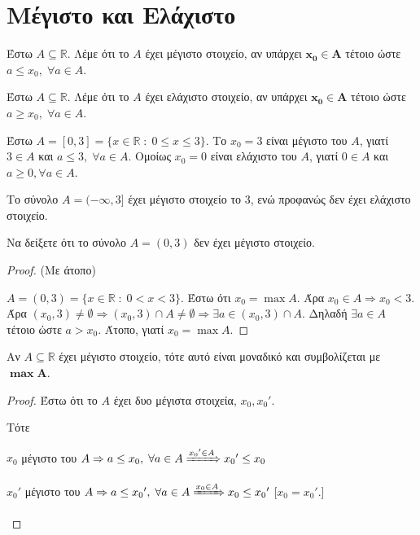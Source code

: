 \documentclass[main.tex]{subfiles}
\begin{document}
\section{Μέγιστο και Ελάχιστο}

\begin{mydfnbox}
  Έστω $ A \subseteq \mathbb{R} $. Λέμε ότι το $A$ έχει μέγιστο στοιχείο, 
  αν υπάρχει $ \bm{x_{0} \in A} $ τέτοιο ώστε $ a \leq x_{0}, \; \forall a \in A $.
\end{mydfnbox}

\begin{mydfnbox}
  Έστω $ A \subseteq \mathbb{R} $. Λέμε ότι το $A$ έχει ελάχιστο στοιχείο, 
  αν υπάρχει $ \bm{x_{0} \in A} $ τέτοιο ώστε $ a \geq x_{0}, \; \forall a \in A$.
\end{mydfnbox}

\begin{example}
  Έστω $ A = [0,3] = \{ x \in \mathbb{R} \; : \; 0 \leq x \leq 3 \} $. 
  Το $ x_{0}= 3 $ είναι μέγιστο του $A$, γιατί $ 3 \in A $ και 
  $ a \leq 3, \; \forall a \in A $. Ομοίως $ x_{0}= 0 $ είναι ελάχιστο 
  του $A$, γιατί $ 0 \in A $ και $ a \geq 0, \forall a \in A $.
\end{example}

\begin{example}
  Το σύνολο $ A=(- \infty, 3] $ έχει μέγιστο στοιχείο το 3, ενώ προφανώς δεν έχει 
  ελάχιστο στοιχείο.
\end{example}

\begin{example}
  Να δείξετε ότι το σύνολο $ A = (0,3) $ δεν έχει μέγιστο στοιχείο.
\end{example}
\begin{proof}(Με άτοπο)
\item {}
  $ A = (0,3) = \{ x \in \mathbb{R} \; : \; 0 < x < 3 \} $. 
  Έστω ότι $ x_{0} = \max A $. Άρα $ x_{0} \in A \Rightarrow  x_{0} 
  < 3$. Άρα  $ (x_{0}, 3) \neq \emptyset \Rightarrow (x_{0},3) \cap A \neq 
  \emptyset \Rightarrow \exists a \in (x_{0},3) \cap A $. Δηλαδή $ 
  \exists a \in A$ τέτοιο ώστε $ a > x_{0} $. Άτοπο, γιατί $ x_{0}= \max A $.
\end{proof}

\begin{mypropbox}
  Αν $ A \subseteq \mathbb{R} $ έχει μέγιστο στοιχείο, τότε αυτό είναι 
  μοναδικό και συμβολίζεται με $ \bm{\max A} $.
\end{mypropbox}
\begin{proof}
  Έστω ότι το $A$ έχει δυο μέγιστα στοιχεία,  $ x_{0}, {x_{0}}' $.

  Τότε 
  \begin{myitemize}
    \item $ x_{0} $ μέγιστο του $A \Rightarrow a \leq x_{0}, \; \forall a \in A \xRightarrow{{x_{0}}' 
      \in A } {x_{0}}'  \leq x_{0} $ 
    \item $ x_{0}' $ μέγιστο του $ A \Rightarrow a \leq {x_{0}}', \; \forall a \in A \xRightarrow{x_{0} 
      \in A } x_{0} \leq {x_{0}}' $ 
      [$ x_{0} = {x_{0}}' $.] 
  \end{myitemize}
\end{proof}
\end{document}
